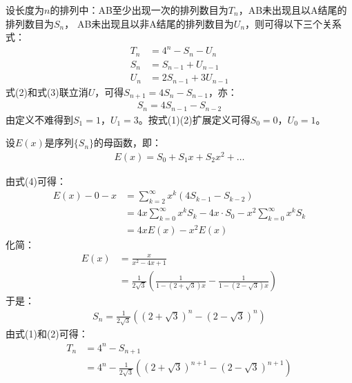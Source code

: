 \begin{solution}
    设长度为$n$的排列中：AB至少出现一次的排列数目为$T_n$，AB未出现且以A结尾的排列数目为$S_n$，
    AB未出现且以非A结尾的排列数目为$U_n$，则可得以下三个关系式：
    \begin{align}
        T_n &= 4^n - S_n - U_n\\
        S_n &= S_{n-1} + U_{n-1}\\
        U_n &= 2S_{n-1} + 3U_{n-1}
    \end{align}
    式(2)和式(3)联立消$U$，可得$S_{n+1}=4S_n-S_{n-1}$，亦：
    \begin{align}
        S_n=4S_{n-1}-S_{n-2}
    \end{align}
    由定义不难得到$S_1=1$，$U_1=3$。按式(1)(2)扩展定义可得$S_0=0$，$U_0=1$。

    设$E(x)$是序列$\{S_n\}$的母函数，即：
    \begin{align*}
        E(x)=S_0+S_1x+S_2x^2+\ldots
    \end{align*}

    由式(4)可得：
    \begin{align*}
        E(x) - 0 - x &= \sum_{k=2}^\infty x^k(4S_{k-1}-S_{k-2})\\
        &= 4x\sum_{k=0}^\infty x^kS_{k} - 4x\cdot S_0 - x^2\sum_{k=0}^\infty x^kS_{k}\\
        &= 4xE(x) - x^2E(x)
    \end{align*}
    化简：
    \begin{align*}
        E(x) &= \frac{x}{x^2-4x+1}\\
        &= \frac{1}{2\sqrt{3}}\left(\frac{1}{1-(2+\sqrt{3})x}-\frac{1}{1-(2-\sqrt{3})x}\right)
    \end{align*}
    于是：
    \begin{align*}
        S_n = \frac{1}{2\sqrt{3}}\left((2+\sqrt{3})^n-(2-\sqrt{3})^n\right)
    \end{align*}
    由式(1)和(2)可得：
    \begin{align*}
        T_n &= 4^n - S_{n+1} \\
        &= 4^n - \frac{1}{2\sqrt{3}}\left((2+\sqrt{3})^{n+1}-(2-\sqrt{3})^{n+1}\right)
    \end{align*}


\end{solution}

